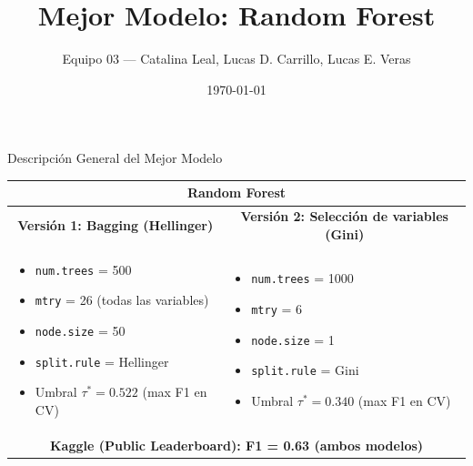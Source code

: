 \documentclass[10pt]{beamer}
\title{Mejor Modelo: Random Forest}
\author{Equipo 03 — Catalina Leal, Lucas D. Carrillo, Lucas E. Veras}
\institute{Big Data y Machine Learning — PS2}
\date{\today}
\begin{document}
\begin{frame}
  \titlepage
\end{frame}

\begin{frame}{Descripción General del Mejor Modelo}
\small
\begin{tabularx}{\textwidth}{@{}X X@{}}
\multicolumn{2}{c}{\Large \textbf{Random Forest}}\\
\midrule
\multicolumn{1}{c}{\textbf{Versión 1: Bagging (Hellinger)}} & \multicolumn{1}{c}{\textbf{Versión 2: Selección de variables (Gini)}}\\
\midrule
\begin{minipage}[t]{\linewidth}
\begin{itemize}
  \item \texttt{num.trees} = 500
  \item \texttt{mtry} = 26 (todas las variables)
  \item \texttt{node.size} = 50
  \item \texttt{split.rule} = Hellinger
  \item Umbral $\tau^{*} = 0.522$ (max F1 en CV)
\end{itemize}
\end{minipage}
&
\begin{minipage}[t]{\linewidth}
\begin{itemize}
  \item \texttt{num.trees} = 1000
  \item \texttt{mtry} = 6
  \item \texttt{node.size} = 1
  \item \texttt{split.rule} = Gini
  \item Umbral $\tau^{*} = 0.340$ (max F1 en CV)
\end{itemize}
\end{minipage}
\\
\midrule
\multicolumn{2}{c}{\textbf{Kaggle (Public Leaderboard): F1 = 0.63 (ambos modelos)}}\\
\bottomrule
\end{tabularx}
\end{frame}
\end{document}
